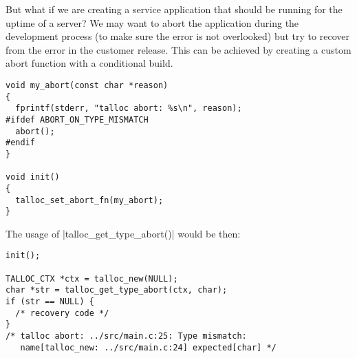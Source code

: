 \noindent
But what if we are creating a service application that should be running for the
uptime of a server? We may want to abort the application during the development
process (to make sure the error is not overlooked) but try to recover from the
error in the customer release. This can be achieved by creating a custom abort
function with a conditional build.

\newpage
\begin{lstlisting}[caption={Custom abort function}]
void my_abort(const char *reason)
{
  fprintf(stderr, "talloc abort: %s\n", reason);
#ifdef ABORT_ON_TYPE_MISMATCH
  abort();
#endif
}

void init()
{
  talloc_set_abort_fn(my_abort);
}
\end{lstlisting}

\noindent
The usage of |talloc_get_type_abort()| would be then:

\begin{lstlisting}[caption={Sample output}]
init();

TALLOC_CTX *ctx = talloc_new(NULL);
char *str = talloc_get_type_abort(ctx, char);
if (str == NULL) {
  /* recovery code */
}
/* talloc abort: ../src/main.c:25: Type mismatch: 
   name[talloc_new: ../src/main.c:24] expected[char] */
\end{lstlisting}

%
